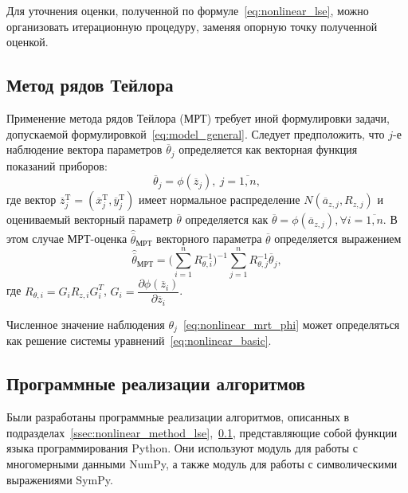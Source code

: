 Для уточнения оценки, полученной по формуле~\eqref{eq:nonlinear_lse}, можно
организовать итерационную процедуру, заменяя опорную точку полученной оценкой.

\vspace{2\baselineskip}
\subsection{Метод рядов Тейлора}\label{ssec:nonlinear_method_mrt}

Применение метода рядов Тейлора (МРТ) требует иной формулировки задачи,
допускаемой формулировкой~\eqref{eq:model_general}.
Следует предположить, что \( j \)-е наблюдение вектора параметров \( \overline{\theta}_j \)
определяется как векторная функция показаний приборов:
\begin{equation}
  \label{eq:nonlinear_mrt_phi}
  \overline{\theta}_j = \phi( \overline{z}_{j} ), \: j = \overline{1, n},
\end{equation}
где вектор
\( \overline{z}^{\text{T}}_{j} =
( \overline{x}^{\text{T}}_{j}, \overline{y}^{\text{T}}_{j}) \)
имеет нормальное распределение \( N(\overline{a}_{z,j}, R_{z,j}) \)
и оцениваемый векторный параметр \( \overline{\theta} \) определяется как
\( \overline{\theta} = \phi(\overline{a}_{z,j}), \forall i = \overline{1, n} \).
В этом случае МРТ-оценка \( \hat{\overline{\theta}}_{\text{МРТ}} \) векторного параметра \( \overline{\theta} \)
определяется выражением
\begin{equation*}
  \hat{\overline{\theta}}_{\text{МРТ}} =
  \Bigg( \sum^{n}_{i=1} R^{-1}_{\theta,i} \Bigg)^{-1}
  \sum^{n}_{j=1} R^{-1}_{\theta,j} \overline{\theta}_j,
\end{equation*}
где
\( R_{\theta,i} = G_i R_{z,i} G^T_i \),
\( G_i =
\dfrac{\partial \phi( \overline{z}_{i} ) }{ \partial \overline{z}_{i} } \).

Численное значение наблюдения \( \theta_j \)~\eqref{eq:nonlinear_mrt_phi} может определяться как
решение системы уравнений~\eqref{eq:nonlinear_basic}.

\vspace{2\baselineskip}
\subsection{Программные реализации алгоритмов}

Были разработаны программные реализации алгоритмов, описанных в
подразделах~\ref{ssec:nonlinear_method_lse},~\ref{ssec:nonlinear_method_mrt},
представляющие собой функции языка программирования Python.
Они используют модуль для работы с многомерными данными NumPy,
а также модуль для работы с символическими выражениями SymPy.

